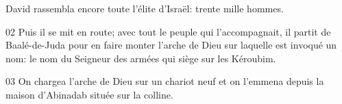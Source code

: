 David rassembla encore toute l’élite d’Israël: trente mille hommes.

02 Puis il se mit en route; avec tout le peuple qui l’accompagnait, il partit de Baalé-de-Juda pour en faire monter l’arche de Dieu sur laquelle est invoqué un nom: le nom du Seigneur des armées qui siège sur les Kéroubim.

03 On chargea l’arche de Dieu sur un chariot neuf et on l’emmena depuis la maison d’Abinadab située sur la colline. 
